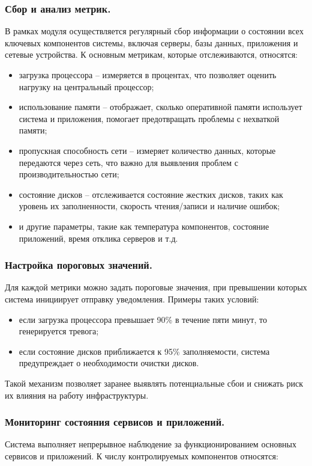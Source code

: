 \subsubsection{Сбор и анализ метрик.}  
В рамках модуля осуществляется регулярный сбор информации о состоянии всех ключевых компонентов системы, включая серверы, базы данных, приложения и сетевые устройства. К основным метрикам, которые отслеживаются, относятся:

\begin{itemize}
    \item загрузка процессора -- измеряется в процентах, что позволяет оценить нагрузку на центральный процессор;
    \item использование памяти -- отображает, сколько оперативной памяти использует система и приложения, помогает предотвращать проблемы с нехваткой памяти;
    \item пропускная способность сети -- измеряет количество данных, которые передаются через сеть, что важно для выявления проблем с производительностью сети;
    \item состояние дисков -- отслеживается состояние жестких дисков, таких как уровень их заполненности, скорость чтения/записи и наличие ошибок;
    \item и другие параметры, такие как температура компонентов, состояние приложений, время отклика серверов и т.д.
\end{itemize}

\subsubsection{Настройка пороговых значений.}  
Для каждой метрики можно задать пороговые значения, при превышении которых система инициирует отправку уведомления. Примеры таких условий:

\begin{itemize}
    \item если загрузка процессора превышает 90\% в течение пяти минут, то генерируется тревога;
    \item если состояние дисков приближается к 95\% заполняемости, система предупреждает о необходимости очистки дисков.
\end{itemize}

Такой механизм позволяет заранее выявлять потенциальные сбои и снижать риск их влияния на работу инфраструктуры.

\subsubsection{Мониторинг состояния сервисов и приложений.}  
Система выполняет непрерывное наблюдение за функционированием основных сервисов и приложений. К числу контролируемых компонентов относятся:

